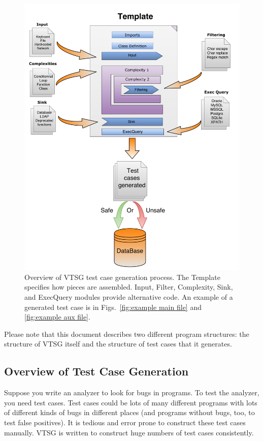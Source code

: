 \documentclass[12pt]{article}
\begin{document}
\begin{figure}[htbp]
  \includegraphics[width=1\linewidth]{fig_VTSG_overview.png}
  \caption{Overview of VTSG test case generation process. The Template
  specifies how pieces are assembled. Input, Filter, Complexity,
  Sink, and ExecQuery modules provide alternative code.  
  An example of
  a generated test case is in 
  Figs.~\ref{fig:example main file} and 
  \ref{fig:example aux file}.}
  \label{fig:VTS operation overview}
\end{figure}

Please note that this document describes two different program structures: the
structure of VTSG itself and the structure of test cases that it generates.

\subsection{Overview of Test Case Generation}

Suppose you write an analyzer to look for bugs in programs.  To test the
analyzer, you need test cases.  Test cases could be lots of many different
programs with lots of different kinds of bugs in different places (and programs
without bugs, too, to test false positives).  It is tedious and error prone to
construct these test cases manually.  VTSG is written to construct huge numbers
of test cases consistently.
\end{document}
